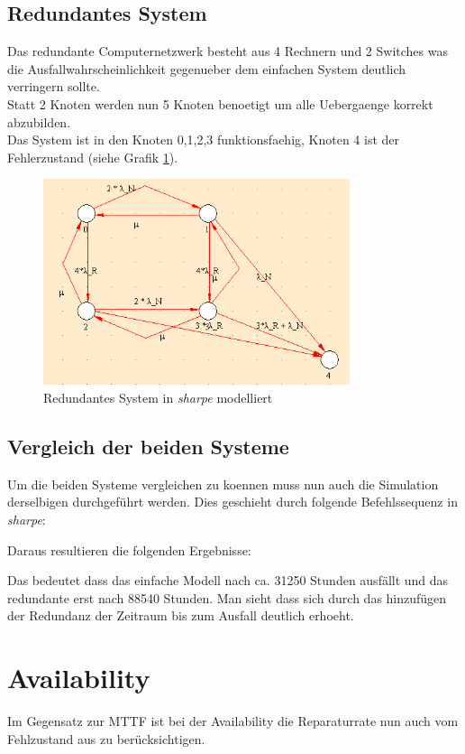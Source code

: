 \documentclass[10pt,a4paper]{article}
\begin{document}

\subsection{Redundantes System}
Das redundante Computernetzwerk besteht aus 4 Rechnern und 2 Switches was die Ausfallwahrscheinlichkeit gegenueber dem einfachen System deutlich verringern sollte.\\
Statt 2 Knoten werden nun 5 Knoten benoetigt um alle Uebergaenge korrekt abzubilden.\\
Das System ist in den Knoten 0,1,2,3 funktionsfaehig, Knoten 4 ist der Fehlerzustand (siehe Grafik \ref{mmtm_redundant}).
\begin{figure}[ht!]
\centering
\includegraphics[width=90mm]{MTTM_ReduntantesModell.png}
\caption{Redundantes System in \textit{sharpe} modelliert \label{mmtm_redundant}}
\end{figure}

\subsection{Vergleich der beiden Systeme}
Um die beiden Systeme vergleichen zu koennen muss nun auch die Simulation derselbigen durchgeführt werden. Dies geschieht durch folgende Befehlssequenz in \textit{sharpe}:


Daraus resultieren die folgenden Ergebnisse: 

Das bedeutet dass das einfache Modell nach ca. 31250 Stunden ausfällt und das redundante erst nach 88540 Stunden. Man sieht dass sich durch das hinzufügen der Redundanz der Zeitraum bis zum Ausfall deutlich erhoeht. 
\section{Availability}
Im Gegensatz zur MTTF ist bei der Availability die Reparaturrate nun auch vom Fehlzustand aus zu berücksichtigen.
\end{document}
